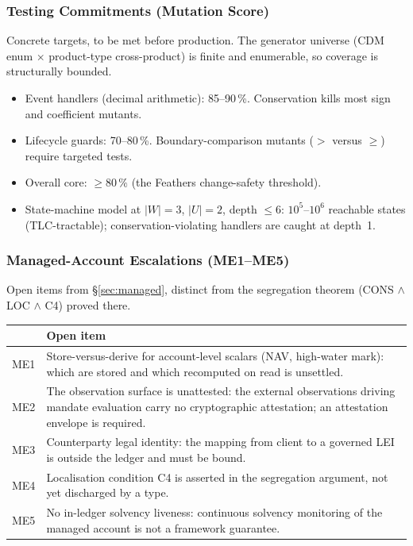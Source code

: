\subsubsection{Testing Commitments (Mutation Score)}

Concrete targets, to be met before production. The generator universe (CDM enum $\times$ product-type cross-product) is finite and enumerable, so coverage is structurally bounded.

\begin{itemize}[nosep]
\item Event handlers (decimal arithmetic): 85--90\,\%. Conservation kills most sign and coefficient mutants.
\item Lifecycle guards: 70--80\,\%. Boundary-comparison mutants ($>$ versus $\geq$) require targeted tests.
\item Overall core: $\geq 80\,\%$ (the Feathers change-safety threshold).
\item State-machine model at $|W|=3$, $|U|=2$, depth $\leq 6$: $10^5$--$10^6$ reachable states (TLC-tractable); conservation-violating handlers are caught at depth~1.
\end{itemize}

\subsubsection{Managed-Account Escalations (ME1--ME5)}

Open items from \S\ref{sec:managed}, distinct from the segregation theorem (CONS $\wedge$ LOC $\wedge$ C4) proved there.

\begin{longtable}{@{}p{0.5cm}p{12.6cm}@{}}
\toprule
& \textbf{Open item} \\
\midrule
\endhead
ME1 & Store-versus-derive for account-level scalars (NAV, high-water mark): which are stored and which recomputed on read is unsettled. \\
ME2 & The observation surface is unattested: the external observations driving mandate evaluation carry no cryptographic attestation; an attestation envelope is required. \\
ME3 & Counterparty legal identity: the mapping from client to a governed LEI is outside the ledger and must be bound. \\
ME4 & Localisation condition C4 is asserted in the segregation argument, not yet discharged by a type. \\
ME5 & No in-ledger solvency liveness: continuous solvency monitoring of the managed account is not a framework guarantee. \\
\bottomrule
\end{longtable}

